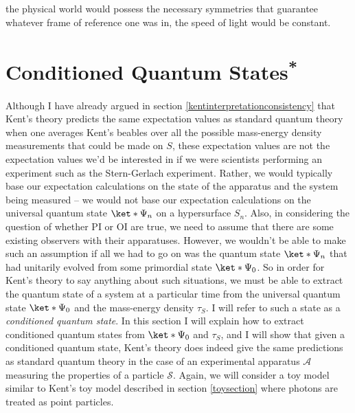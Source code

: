 \documentclass[12pt]{report}
\begin{document}
the physical world would possess the necessary symmetries that guarantee whatever frame of reference one was in, the speed of light would be constant.  



\section{Conditioned Quantum States\textsuperscript{*}\label{KentconsistentQT}}
Although I have already argued in section \ref{kentinterpretationconsistency} that Kent's theory predicts the same expectation values as standard quantum theory when one averages Kent's beables over all the possible mass-energy density measurements that could be made on $S$, these expectation values are not the expectation values we'd be interested in if we were scientists performing an experiment such as the Stern-Gerlach experiment. Rather, we would typically base our expectation calculations on the state of the apparatus and the system being measured -- we would not base our expectation calculations on the  universal quantum state $\ket*{\Psi_n}$ on a hypersurface $S_n$. Also, in considering the question of whether PI or OI are true, we need to assume that there are some existing observers with their apparatuses. However, we wouldn't be able to make such an assumption if all we had to go on was the quantum state $\ket*{\Psi_n}$ that had unitarily evolved from some primordial state $\ket*{\Psi_0}$. So in order for Kent's theory to say anything about such situations, we must be able to extract the quantum state of a system at a particular time from the universal quantum state $\ket*{\Psi_0}$ and the mass-energy density $\tau_S$. I will refer to such a state as a \emph{conditioned quantum state}. In this section I will explain how to extract conditioned quantum states from $\ket*{\Psi_0}$ and $\tau_S$, and I will show that given a conditioned quantum state, Kent's theory does indeed give the same predictions as standard quantum theory in the case of an experimental apparatus $\mathcal{A}$ measuring the properties of a particle $\mathcal{S}$. Again, we will consider a toy model similar to Kent's toy model described in section \ref{toysection} where photons are treated as point particles. 
\end{document}

